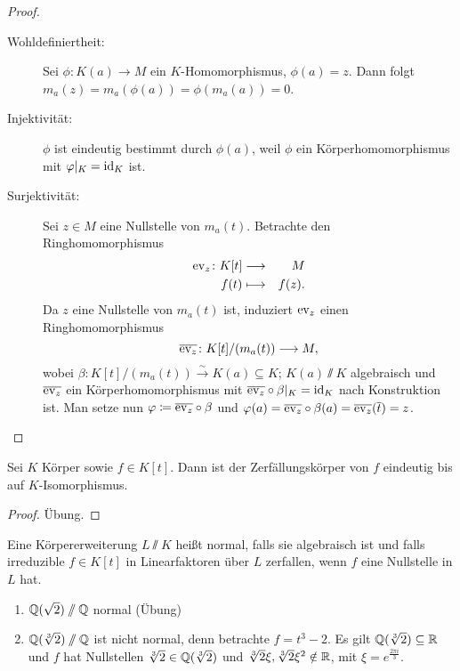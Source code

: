 \documentclass[12pt,a4paper]{scrartcl}
\begin{document}
\begin{proof}
	\leavevmode
	\begin{description}
		\item[Wohldefiniertheit:] Sei $\phi\colon K(a)\to M$ ein $K$-Homomorphismus, $\phi(a) = z$. Dann folgt $m_a(z) = m_a(\phi(a)) = \phi(m_a(a)) = 0$.
		\item[Injektivität:] $\phi$ ist eindeutig bestimmt durch $\phi(a)$, weil $\phi$ ein Körperhomomorphismus mit $\varphi|_K = \operatorname{id}_K$ ist.
		\item[Surjektivität:] Sei $z\in M$ eine Nullstelle von $m_a(t)$. Betrachte den Ringhomomorphismus
		\begin{eqnarray*}
			\operatorname{ev}_z\colon K[t] & \longrightarrow & M\\
			f(t) &\longmapsto & f(z).
		\end{eqnarray*}
		Da $z$ eine Nullstelle von $m_a(t)$ ist, induziert $\operatorname{ev}_z$ einen Ringhomomorphismus
		\[\overline{\operatorname{ev}_z}\colon K[t]/(m_a(t))\longrightarrow M,\]
		wobei $\beta\colon K[t]/(m_a(t)) \xrightarrow{\sim} K(a)\subseteq K$; $K(a)\sslash K$ algebraisch und $\overline{\operatorname{ev}_z}$ ein Körperhomomorphismus mit $\overline{\operatorname{ev}_z}\circ \beta|_K = \operatorname{id}_K$ nach Konstruktion ist. Man setze nun $\varphi\coloneqq \overline{\operatorname{ev}_z}\circ\beta$ und $\varphi(a) = \overline{\operatorname{ev}_z}\circ\beta(a) = \overline{\operatorname{ev}_z}(\overline{t}) = z$.
  \qedhere
	\end{description}
\end{proof}
\begin{kor}
	Sei $K$ Körper sowie $f\in K[t]$. Dann ist der Zerfällungskörper von $f$ eindeutig bis auf $K$-Isomorphismus.
\end{kor}
\begin{proof}
	Übung.
\end{proof}
\begin{defi} Eine Körpererweiterung $L\sslash K$ heißt normal, falls sie algebraisch ist und falls  irreduzible $f\in K[t]$ in Linearfaktoren über $L$ zerfallen, wenn $f$ eine Nullstelle in $L$ hat.
\end{defi}
\begin{bsp}
	\leavevmode
	\begin{enumerate}
		\item $\mathbb Q(\sqrt{2})\sslash \mathbb Q$ normal (Übung)
		\item $\mathbb Q(\sqrt[3]{2})\sslash \mathbb Q$ ist nicht normal, denn betrachte $f = t^3-2$. Es gilt $\mathbb Q(\sqrt[3]{2})\subseteq \mathbb R$ und $f$ hat Nullstellen $\sqrt[3]{2}\in \mathbb Q(\sqrt[3]{2})$ und $\sqrt[3]{2}\xi, \sqrt[3]{2}\xi^2\notin \mathbb R$, mit $\xi = e^{\frac{2\pi i}{3}}$.
	\end{enumerate}
\end{bsp}
\end{document}
